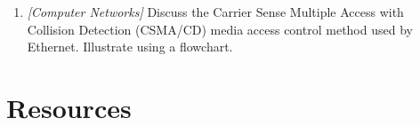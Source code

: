 \documentclass{article}
\begin{document}
\begin{enumerate}
{		\begin{enumerate}
			\item{Most file operations are large streaming reads.}
			\item{Storage uses many inexpensive commodity components that can fail.}
			\item{Writes are mostly append.} 
			\item{Throughput is more important than latency.}
			\item{Can support very large amounts of data.}
		\end{enumerate}
		(Hint: GFS, HDFS)}
		
	\item{\textit{[Computer Networks]} Discuss the Carrier Sense Multiple Access with Collision Detection (CSMA/CD) media access control method used by Ethernet. Illustrate using a flowchart.
		}  	
  	
\end{enumerate}

\section*{Resources}
\end{document}

